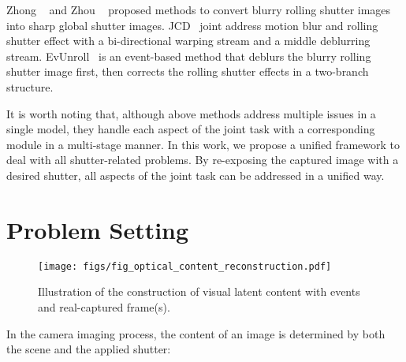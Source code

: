 \documentclass[10pt,twocolumn,letterpaper]{article}
\begin{document}
Zhong \etal~\cite{JCD} and Zhou \etal~\cite{EvUnroll}  proposed methods to convert blurry rolling shutter images into sharp global shutter images. 
JCD~\cite{JCD} joint address motion blur and rolling shutter effect with a bi-directional warping stream and a middle deblurring stream.
EvUnroll~\cite{EvUnroll} is an event-based method that deblurs the blurry rolling shutter image first, then corrects the rolling shutter effects in a two-branch structure.

It is worth noting that, although above methods address multiple issues in a single model, they handle each aspect of the joint task with a corresponding module in a multi-stage manner.
In this work, we propose a unified framework to deal with all shutter-related problems. By re-exposing the captured image with a desired shutter, all aspects of the joint task can be addressed in a unified way.  









 
\section{Problem Setting}
\label{sec:Problem Setting}

\begin{figure*}
	\centering
	\texttt{[image: figs/fig\_optical\_content\_reconstruction.pdf]}
	\caption{Illustration of the construction of visual latent content with events and real-captured frame(s).}
	\label{fig:visual_latent_space_construction}
	\vspace{-1.0em}
\end{figure*}



In the camera imaging process, the content of an image is determined by both the scene and the applied shutter:
\end{document}
